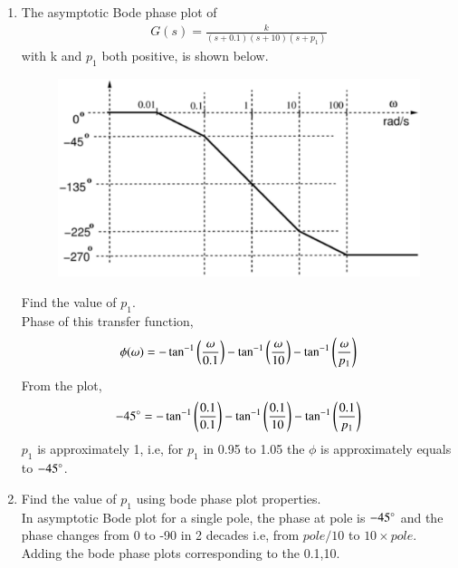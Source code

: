\begin{enumerate}[label=\thesubsection.\arabic*.,ref=\thesubsection.\theenumi]


\item The asymptotic Bode phase plot of 
%
\begin{align}
\label{eq:ee18btech11037_gs}
G(s) = \frac{k}{(s+0.1)(s+10)(s+{p_1})}
\end{align}
%
with k and $p_1$ both positive, is shown below.
\begin{figure}[!ht]
\centering
\includegraphics[width=\columnwidth]{figs/ee18btech11037/ee18btech11037.eps}
\caption{}
\label{fig:ee18btech11037}
\end{figure}
Find the value of \textit{$p_1$}.
\\
\solution
Phase of this transfer function,
\begin{align}
\phi(\omega) = -\tan^{-1} \left(\frac{\omega}{0.1}\right)-\tan^{-1} \left(\frac{\omega}{10}\right)-\tan^{-1} \left(\frac{\omega}{p_1}\right)
\end{align}
From the plot,
\begin{align}
-45\degree = -\tan^{-1}\left(\frac{0.1}{0.1}\right) -\tan^{-1}\left(\frac{0.1}{10}\right) -\tan^{-1}\left(\frac{0.1}{p_1}\right)
\end{align}
 $p_1$ is approximately 1, i.e, for $p_1$ in 0.95 to 1.05 the $\phi$ is approximately equals to $-45\degree$.
%
\item Find the value of $p_1$ using bode phase plot properties.
\\
\solution In asymptotic Bode plot for a single pole, the phase at pole is $-45\degree$ and the phase changes from 0 to -90 in 2 decades i.e, from $pole/10$ to $10\times pole$. 
\\
Adding the bode phase plots corresponding to the 0.1,10.
\begin{figure}[!ht]

\end{figure}
\end{enumerate}
